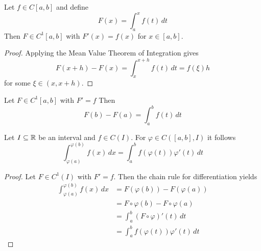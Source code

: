 \begin{theorem}\label{thm:differentiation}
Let \( f \in C[a,b] \) and define 
\[
    F(x) = \int_a^x f(t)\,dt
\]
Then \( F \in C^1[a,b] \) with \( F'(x) = f(x) \) for \( x \in [a,b] \).
\end{theorem}

\begin{proof}
Applying the Mean Value Theorem of Integration gives
\[
    F(x + h) - F(x) =  \int_x^{x + h} f(t)\,dt = f(\xi) h
\]
for some \( \xi \in (x, x + h) \).
\end{proof}
\bigskip

\begin{theorem}\label{thm:fund_calculus}
Let \( F \in C^1[a,b] \) with \( F' = f \)  Then
\[
    F(b) -F(a) = \int_a^b f(t)\,dt
\]
\end{theorem}
\bigskip


\begin{lemma}
Let \( I \subseteq \mathbb{R} \) be an interval and \( f \in C(I) \). For \( \varphi \in C([a,b], I) \) it follows
\[
	\int_{\varphi(a)}^{\varphi(b)} f(x)\,dx = \int_{a}^{b} f(\varphi(t))\varphi'(t)\,dt
\]
\end{lemma}
\begin{proof}
Let \( F \in C^1(I) \) with \( F' = f \). Then the chain rule for differentiation yields
\[
	\begin{split}
		\int_{\varphi(a)}^{\varphi(b)} f(x)\,dx 
			&= F(\varphi(b)) - F(\varphi(a)) \\
			&= F\circ\varphi(b) - F\circ\varphi(a) \\
			&= \int_{a}^{b} (F\circ\varphi)'(t)\,dt \\
			&= \int_{a}^{b} f(\varphi(t))\varphi'(t)\,dt
	\end{split}
\]
\end{proof}
\bigskip

